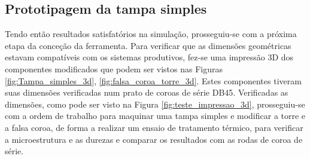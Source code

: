 \subsection{Prototipagem da tampa simples}  \label{ssec:materiais_prototipagem_simples}
Tendo então resultados satisfatórios na simulação, prosseguiu-se com a próxima etapa da conceção da ferramenta. Para verificar que as dimensões geométricas estavam compatíveis com os sistemas produtivos, fez-se uma impressão 3D dos componentes modificados que podem ser vistos nas Figuras \ref{fig:Tampa_simples_3d}, \ref{fig:falsa_coroa_torre_3d}. Estes componentes tiveram suas dimensões verificadas num prato de coroas de série DB45. Verificadas as dimensões, como pode ser visto na Figura \ref{fig:teste_impressao_3d}, prosseguiu-se com a ordem de trabalho para maquinar uma tampa simples e modificar a torre e a falsa coroa, de forma a realizar um ensaio de tratamento térmico, para verificar a microestrutura e as durezas e comparar os resultados com as rodas de coroa de série.
